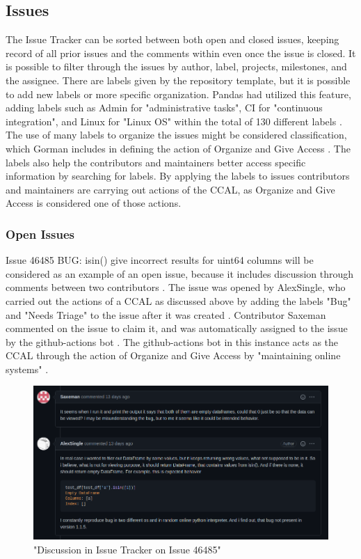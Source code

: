 \subsection{Issues}

The Issue Tracker can be sorted between both open and closed issues, keeping record of all prior issues and the comments within even once the issue is closed. It is possible to filter through the issues by author, label, projects, milestones, and the assignee. There are labels given by the repository template, but it is possible to add new labels or more specific organization. Pandas had utilized this feature, adding labels such as Admin for "administrative tasks", CI for "continuous integration", and Linux for "Linux OS" within the total of 130 different labels \cite{pandasrepo}. The use of many labels to organize the issues might be considered classification, which Gorman includes in defining the action of Organize and Give Access \cite{gorman2000values}. The labels also help the contributors and maintainers better access specific information by searching for labels. By applying the labels to issues contributors and maintainers are carrying out actions of the CCAL, as Organize and Give Access is considered one of those actions.

\subsubsection{Open Issues}

Issue 46485 BUG: isin() give incorrect results for uint64 columns will be considered as an example of an open issue, because it includes discussion through comments between two contributors \cite{pandasrepo}. The issue was opened by AlexSingle, who carried out the actions of a CCAL as discussed above by adding the labels "Bug" and "Needs Triage" to the issue after it was created \cite{pandasrepo}. Contributor Saxeman commented on the issue to claim it, and was automatically assigned to the issue by the github-actions bot \cite{pandasrepo}. The github-actions bot in this instance acts as the CCAL through the action of Organize and Give Access by "maintaining online systems" \cite{gorman2000values}. 

\begin{figure}[hbt!]
\begin{center}
\includegraphics[width=.8\textwidth]{./images/issue_discussion.png}
\caption{"Discussion in Issue Tracker on Issue 46485"}
\vspace{0in}
\end{center}
\end{figure}

